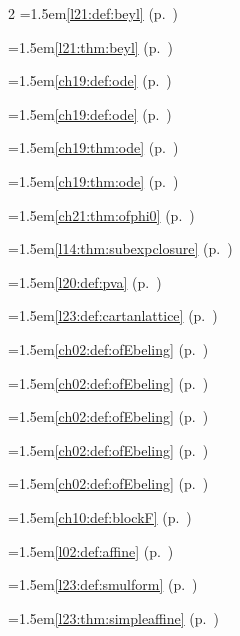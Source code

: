 \begin{multicols}{2}
\hangindent=1.5em\quad \ref{l21:def:beyl} (p.~\pageref{l21:def:beyl})\par
\hangindent=1.5em\quad \ref{l21:thm:beyl} (p.~\pageref{l21:thm:beyl})\par
\hangindent=1.5em\quad \ref{ch19:def:ode} (p.~\pageref{ch19:def:ode})\par
\hangindent=1.5em\quad \ref{ch19:def:ode} (p.~\pageref{ch19:def:ode})\par
\hangindent=1.5em\quad \ref{ch19:thm:ode} (p.~\pageref{ch19:thm:ode})\par
\hangindent=1.5em\quad \ref{ch19:thm:ode} (p.~\pageref{ch19:thm:ode})\par
\hangindent=1.5em\quad \ref{ch21:thm:ofphi0} (p.~\pageref{ch21:thm:ofphi0})\par
\hangindent=1.5em\quad \ref{l14:thm:subexpclosure} (p.~\pageref{l14:thm:subexpclosure})\par
\hangindent=1.5em\quad \ref{l20:def:pva} (p.~\pageref{l20:def:pva})\par
\hangindent=1.5em\quad \ref{l23:def:cartanlattice} (p.~\pageref{l23:def:cartanlattice})\par
\hangindent=1.5em\quad \ref{ch02:def:ofEbeling} (p.~\pageref{ch02:def:ofEbeling})\par
\hangindent=1.5em\quad \ref{ch02:def:ofEbeling} (p.~\pageref{ch02:def:ofEbeling})\par
\hangindent=1.5em\quad \ref{ch02:def:ofEbeling} (p.~\pageref{ch02:def:ofEbeling})\par
\hangindent=1.5em\quad \ref{ch02:def:ofEbeling} (p.~\pageref{ch02:def:ofEbeling})\par
\hangindent=1.5em\quad \ref{ch02:def:ofEbeling} (p.~\pageref{ch02:def:ofEbeling})\par
\hangindent=1.5em\quad \ref{ch10:def:blockF} (p.~\pageref{ch10:def:blockF})\par
\hangindent=1.5em\quad \ref{l02:def:affine} (p.~\pageref{l02:def:affine})\par
\hangindent=1.5em\quad \ref{l23:def:smulform} (p.~\pageref{l23:def:smulform})\par
\hangindent=1.5em\quad \ref{l23:thm:simpleaffine} (p.~\pageref{l23:thm:simpleaffine})\par

\end{multicols}

